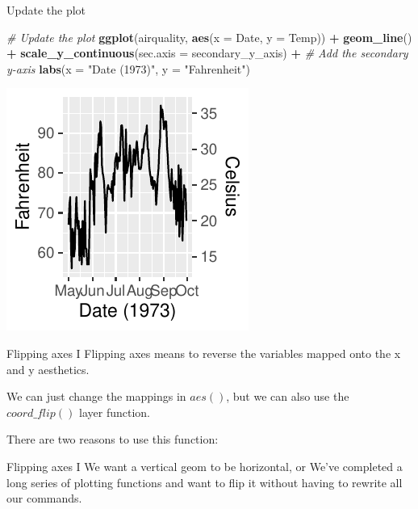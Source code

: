 \documentclass[
  ignorenonframetext,
]{beamer}
\newenvironment{Shaded}{\begin{snugshade}}{\end{snugshade}}
\newcommand{\AttributeTok}[1]{\textcolor[rgb]{0.13,0.29,0.53}{#1}}
\newcommand{\CommentTok}[1]{\textcolor[rgb]{0.56,0.35,0.01}{\textit{#1}}}
\newcommand{\FunctionTok}[1]{\textcolor[rgb]{0.13,0.29,0.53}{\textbf{#1}}}
\newcommand{\NormalTok}[1]{#1}
\newcommand{\SpecialCharTok}[1]{\textcolor[rgb]{0.81,0.36,0.00}{\textbf{#1}}}
\newcommand{\StringTok}[1]{\textcolor[rgb]{0.31,0.60,0.02}{#1}}
\begin{document}
\begin{frame}[fragile]{Update the plot}
\label{update-the-plot}

\begin{Shaded}
\begin{Highlighting}[]
\CommentTok{\# Update the plot}
\FunctionTok{ggplot}\NormalTok{(airquality, }\FunctionTok{aes}\NormalTok{(}\AttributeTok{x =}\NormalTok{ Date, }\AttributeTok{y =}\NormalTok{ Temp)) }\SpecialCharTok{+}
  \FunctionTok{geom\_line}\NormalTok{() }\SpecialCharTok{+}
  \FunctionTok{scale\_y\_continuous}\NormalTok{(}\AttributeTok{sec.axis =}\NormalTok{ secondary\_y\_axis) }\SpecialCharTok{+} \CommentTok{\# Add the secondary y{-}axis }
  \FunctionTok{labs}\NormalTok{(}\AttributeTok{x =} \StringTok{"Date (1973)"}\NormalTok{, }\AttributeTok{y =} \StringTok{"Fahrenheit"}\NormalTok{)}
\end{Highlighting}
\end{Shaded}

\begin{center}\includegraphics[width=0.5\linewidth]{Figs/unnamed-chunk-58-1} \end{center}
\end{frame}

\begin{frame}{Flipping axes I}
\label{flipping-axes-i}
Flipping axes means to reverse the variables mapped onto the x and y
aesthetics.

We can just change the mappings in \(aes()\), but we can also use the
\(coord\_flip()\) layer function.

There are two reasons to use this function:
\end{frame}

\begin{frame}{Flipping axes I}
\label{flipping-axes-i-1}
We want a vertical geom to be horizontal, or We've completed a long
series of plotting functions and want to flip it without having to
rewrite all our commands.
\end{frame}
\end{document}
